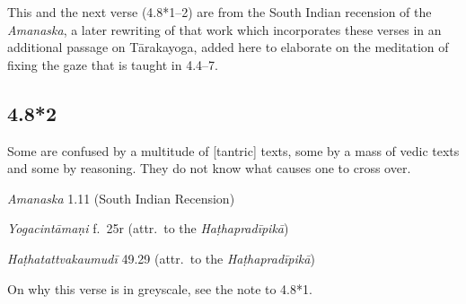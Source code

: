 \begin{ekdosis}
\begin{philcomm}[hp04_008_1]
This and the next verse (4.8*1–2) are from the South Indian recension of the \emph{Amanaska}, a later rewriting of that work which incorporates these verses in an additional passage on Tārakayoga, added here to elaborate on the meditation of fixing the gaze that is taught in 4.4–7. 
\end{philcomm}

\subsection*{4.8*2}
\begin{translation}[hp04_008_2]
Some are confused by a multitude of [tantric] texts, some by a mass of vedic texts and some by reasoning. They do not know what causes one to cross over.%
\end{translation}

\begin{sources}[hp04_008_2]
\emph{Amanaska} 1.11 (South Indian Recension)
\begin{versinnote}
\end{versinnote}
\end{sources}

\begin{testimonia}[hp04_008_2]
\emph{Yogacintāmaṇi} f.~25r (attr.~to the \emph{Haṭhapradīpikā})
\begin{versinnote}
\end{versinnote}

\emph{Haṭhatattvakaumudī} 49.29 (attr.~to the \emph{Haṭhapradīpikā})
\begin{versinnote}
\end{versinnote}
\end{testimonia}

\begin{philcomm}[hp04_008_2]
On why this verse is in greyscale, see the note to 4.8*1.
\end{philcomm}


\end{ekdosis}

